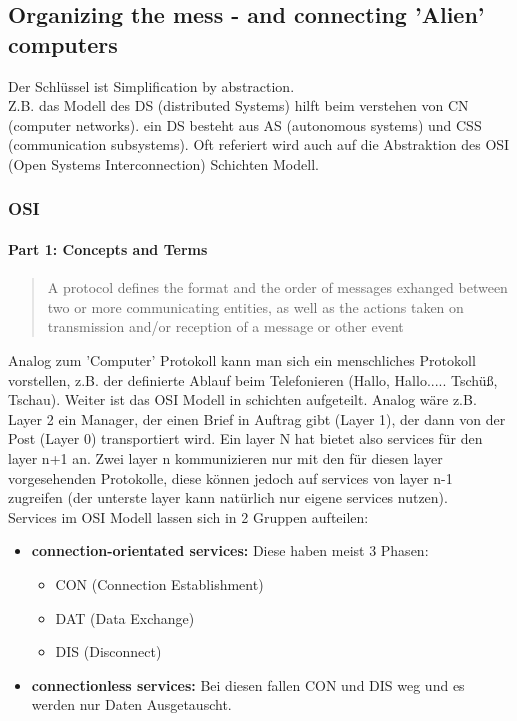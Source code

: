 	\subsection{Organizing the mess - and connecting 'Alien' computers}
		Der Schlüssel ist \frQuo Simplification by abstraction\frQuc. \\
		Z.B. das Modell des DS (distributed Systems) hilft beim verstehen von CN (computer networks). ein DS besteht aus AS (autonomous systems) und CSS (communication subsystems). Oft referiert wird auch auf die Abstraktion des OSI (Open Systems Interconnection) Schichten Modell.
		\subsubsection{OSI}
			\paragraph{Part 1: Concepts and Terms}
				\begin{quote}
					\frQuo A protocol defines the format and the order of messages exhanged between two or more communicating entities, as well as the actions taken on transmission and/or reception of a message or other event\frQuc
				\end{quote}
				Analog zum 'Computer' Protokoll kann man sich ein menschliches Protokoll vorstellen, z.B. der definierte Ablauf beim Telefonieren (Hallo, Hallo..... Tschüß, Tschau).
				Weiter ist das OSI Modell in schichten aufgeteilt. Analog wäre z.B. Layer 2 ein Manager, der einen Brief in Auftrag gibt (Layer 1), der dann von der Post (Layer 0) transportiert wird. Ein layer N hat bietet also services für den layer n+1 an. Zwei layer n kommunizieren nur mit den für diesen layer vorgesehenden Protokolle, diese können jedoch auf services von layer n-1 zugreifen (der unterste layer kann natürlich nur eigene services nutzen). \\
				Services im OSI Modell lassen sich in 2 Gruppen aufteilen:
				\begin{itemize}
					\item \textbf{connection-orientated services:}
						Diese haben meist 3 Phasen: 
						\begin{itemize}
							\item CON (Connection Establishment)
							\item DAT (Data Exchange)
							\item DIS (Disconnect)
						\end{itemize}
					\item \textbf{connectionless services:}
						Bei diesen fallen CON und DIS weg und es werden nur Daten Ausgetauscht. 
				\end{itemize}

